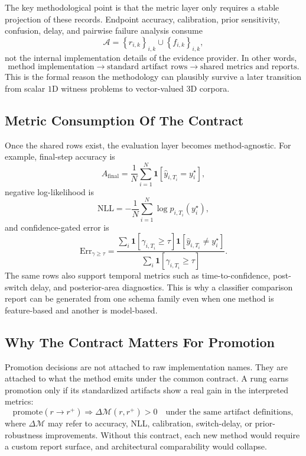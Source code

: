\documentclass[11pt]{article}
\begin{document}
The key methodological point is that the metric layer only requires a stable
projection of these records. Endpoint accuracy, calibration, prior
sensitivity, confusion, delay, and pairwise failure analysis consume
\begin{equation}
\mathcal{A}
=
\left\{
    r_{i,k}
\right\}_{i,k}
\cup
\left\{
    f_{i,k}
\right\}_{i,k},
\end{equation}
not the internal implementation details of the evidence provider. In other
words,
\begin{equation}
\text{method implementation}
\rightarrow
\text{standard artifact rows}
\rightarrow
\text{shared metrics and reports}.
\end{equation}
This is the formal reason the methodology can plausibly survive a later
transition from scalar \(1\text{D}\) witness problems to vector-valued \(3\text{D}\)
corpora.

\subsection{Metric Consumption Of The Contract}
Once the shared rows exist, the evaluation layer becomes method-agnostic. For
example, final-step accuracy is
\begin{equation}
A_{\mathrm{final}}
=
\frac{1}{N}
\sum_{i=1}^N
\mathbf{1}\!\left[
    \hat{y}_{i,T_i} = y_i^\star
\right],
\end{equation}
negative log-likelihood is
\begin{equation}
\mathrm{NLL}
=
-\frac{1}{N}
\sum_{i=1}^N
\log p_{i,T_i}(y_i^\star),
\end{equation}
and confidence-gated error is
\begin{equation}
\mathrm{Err}_{\gamma \ge \tau}
=
\frac{
\sum_i \mathbf{1}[\gamma_{i,T_i} \ge \tau]
\mathbf{1}[\hat{y}_{i,T_i} \neq y_i^\star]
}{
\sum_i \mathbf{1}[\gamma_{i,T_i} \ge \tau]
}.
\end{equation}
The same rows also support temporal metrics such as time-to-confidence,
post-switch delay, and posterior-area diagnostics. This is why a classifier
comparison report can be generated from one schema family even when one method
is feature-based and another is model-based.

\subsection{Why The Contract Matters For Promotion}
Promotion decisions are not attached to raw implementation names. They are
attached to what the method emits under the common contract. A rung earns
promotion only if its standardized artifacts show a real gain in the
interpreted metrics:
\begin{equation}
\text{promote}(r \rightarrow r^+)
\Rightarrow
\Delta \mathcal{M}(r,r^+) > 0
\quad \text{under the same artifact definitions},
\end{equation}
where \(\Delta \mathcal{M}\) may refer to accuracy, NLL, calibration,
switch-delay, or prior-robustness improvements. Without this contract, each new
method would require a custom report surface, and architectural comparability
would collapse.
\end{document}
